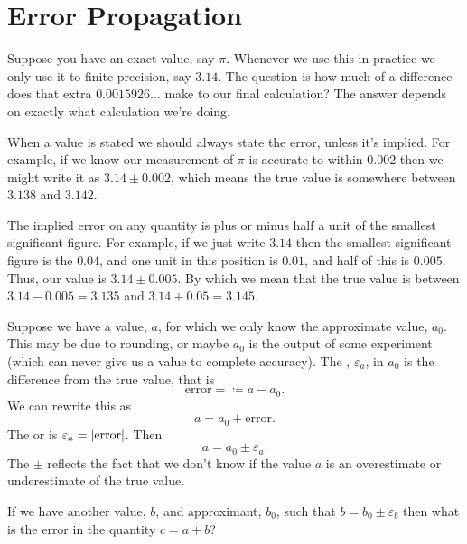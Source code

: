 \documentclass[fleqn]{LectureClass/LectureClass}
\begin{document}
    \section{Error Propagation}
    Suppose you have an exact value, say \(\pi\).
    Whenever we use this in practice we only use it to finite precision, say \(3.14\).
    The question is how much of a difference does that extra \(0.0015926\dots\) make to our final calculation?
    The answer depends on exactly what calculation we're doing.
    
    When a value is stated we should always state the error, unless it's implied.
    For example, if we know our measurement of \(\pi\) is accurate to within \(0.002\) then we might write it as \(3.14 \pm 0.002\), which means the true value is somewhere between \(3.138\) and \(3.142\).
    
    The implied error on any quantity is plus or minus half a unit of the smallest significant figure.
    For example, if we just write \(3.14\) then the smallest significant figure is the \(0.04\), and one unit in this position is \(0.01\), and half of this is \(0.005\).
    Thus, our value is \(3.14 \pm 0.005\).
    By which we mean that the true value is between \(3.14 - 0.005 = 3.135\) and \(3.14 + 0.05 = 3.145\).
    
    Suppose we have a value, \(a\), for which we only know the approximate value, \(a_0\).
    This may be due to rounding, or maybe \(a_0\) is the output of some experiment (which can never give us a value to complete accuracy).
    The , \(\varepsilon_a\), in \(a_0\) is the difference from the true value, that is
    \begin{equation}
        \text{error} = \coloneq a - a_0.
    \end{equation}
    We can rewrite this as
    \begin{equation}
        a = a_0 + \text{error}.
    \end{equation}
    The  or  is \(\varepsilon_a = \lvert\text{error}\rvert\).
    Then
    \begin{equation}
        a = a_0 \pm \varepsilon_a.
    \end{equation}
    The \(\pm\) reflects the fact that we don't know if the value \(a\) is an overestimate or underestimate of the true value.
    
    If we have another value, \(b\), and approximant, \(b_0\), such that \(b = b_0 \pm \varepsilon_b\) then what is the error in the quantity \(c = a + b\)?
    
\end{document}
